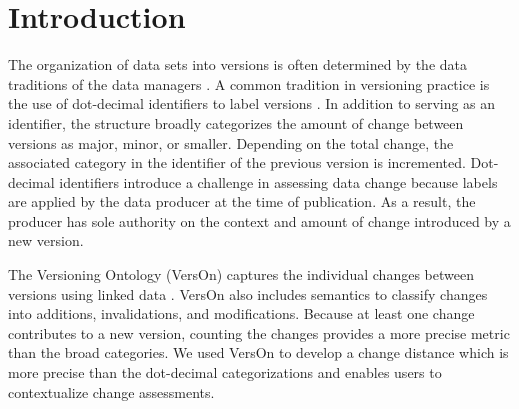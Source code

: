 

\maketitle

\section{Introduction}

The organization of data sets into versions is often determined by the data traditions of the data managers \cite{barkstrom2014earth}.
A common tradition in versioning practice is the use of dot-decimal identifiers to label versions \cite{Tagger2005}.
In addition to serving as an identifier, the structure broadly categorizes the amount of change between versions as major, minor, or smaller.
Depending on the total change, the associated category in the identifier of the previous version is incremented.
Dot-decimal identifiers introduce a challenge in assessing data change because labels are applied by the data producer at the time of publication.
As a result, the producer has sole authority on the context and amount of change introduced by a new version.

The Versioning Ontology (VersOn) captures the individual changes between versions using linked data \cite{VO_model}.
VersOn also includes semantics to classify changes into additions, invalidations, and modifications.
Because at least one change contributes to a new version, counting the changes provides a more precise metric than the broad categories.
We used VersOn to develop a change distance which is more precise than the dot-decimal categorizations and enables users to contextualize change assessments.
